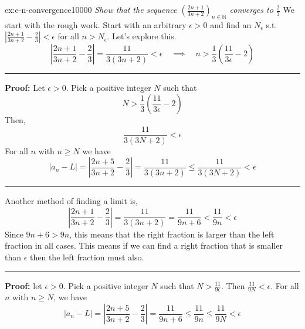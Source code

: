 \documentclass[landscape, 8pt]{extarticle}
\begin{document}
\begin{multicols}{3}
\begin{xmp}{ex:e-n-convergence}{10000}
    \textit{Show that the sequence $\left( \frac{2n+1}{3n+2} \right)_{n\in\mathbb{N}}$ converges to $\frac{2}{3}$}
    \vspace{0pt}\newline
    We start with the rough work. Start with an arbitrary $\epsilon>0$ and find an $N_{\epsilon}$ s.t. $\left\lvert  \frac{2n+1}{3n+2} -\frac{2}{3}  \right\rvert < \epsilon$ for all $n>N_{\epsilon}$. Let's explore this.
    \[\left\lvert  \frac{2n+1}{3n+2}-\frac{2}{3}  \right\rvert =\frac{11}{3(3n+2)} < \epsilon\quad\implies \quad n> \frac{1}{3}\left( \frac{11}{3\epsilon} -2\right)\]
    \vspace{3pt}
    \hrule
    \vspace{3pt}
    \noindent\textbf{Proof:} Let $\epsilon>0$. Pick a positive integer $N$ such that
    \[N>\frac{1}{3}\left( \frac{11}{3\epsilon}-2 \right)\]
    Then,
    \[\frac{11}{3(3N+2)} < \epsilon\]
    For all $n$ with $n\ge N$ we have 
    \[\lvert a_{n}-L \rvert = \left\lvert  \frac{2n+5}{3n+2} - \frac{2}{3}  \right\rvert =\frac{11}{3(3n+2)} \le \frac{11}{3(3N+2)}<\epsilon\]
    \vspace{3pt}
    \hrule
    \vspace{3pt}
    \noindent Another method of finding a limit is,
    $$\left\lvert  \frac{2n+1}{3n+2}-\frac{2}{3}  \right\rvert =\frac{11}{3(3n+2)} = \frac{11}{9n+6} < \frac{11}{9n}< \epsilon$$
    Since $9n+6>9n$, this means that the right fraction is larger than the left fraction in all cases. This means if we can find a right fraction that is smaller than $\epsilon$ then the left fraction must also.
    \vspace{3pt}
    \hrule
    \vspace{3pt}
    \noindent\textbf{Proof:} let $\epsilon>0$. Pick a positive integer $N$ such that $N>\frac{11}{9\epsilon}$. Then $\frac{11}{9N} < \epsilon$. For all $n$ with $n\ge N$, we have
    $$\lvert a_{n}-L \rvert = \left\lvert  \frac{2n+5}{3n+2} - \frac{2}{3}  \right\rvert =\frac{11}{9n+6} \le \frac{11}{9n} \le \frac{11}{9N}<\epsilon$$
\end{xmp}
\vspace{-5pt}

\newpage


\end{multicols}
\end{document}
